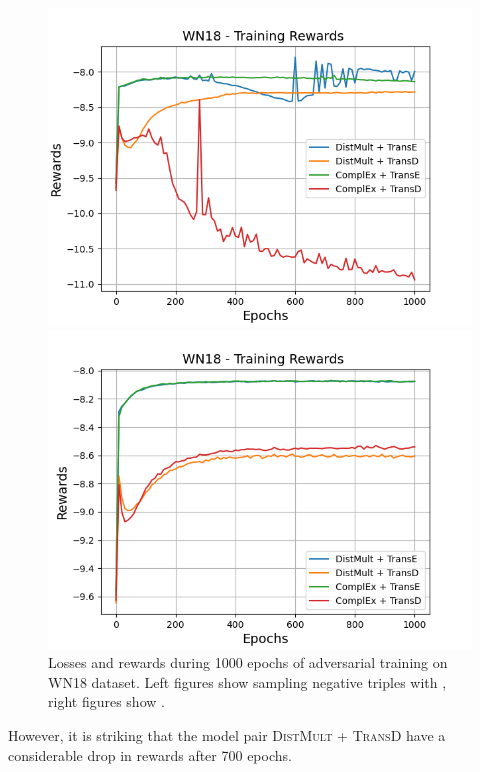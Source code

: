 \begin{figure}[H]
\begin{minipage}{.5\textwidth}
      \centering
      \includegraphics[width=0.9\linewidth]{figures/results/gan_train/not_pretrained/uncertainty/max/entropy/wn18/1k_epochs/uncertainty_wn18_rew.png}
    \end{minipage}%
    \begin{minipage}{.5\textwidth}
      \centering
      \includegraphics[width=0.9\linewidth]{figures/results/gan_train/not_pretrained/uncertainty/max_distribution/entropy/wn18/1k_epochs/uncertainty_wn18_rew.png}
    \end{minipage}%
    \caption{Losses and rewards during 1000 epochs of adversarial training on \textsc{WN18} dataset. 
    Left figures show sampling negative triples with \usmax, right figures show \ussoftmax.}
    \label{fig:advtrain_wn18_usmax_ussoftmax_losses_rewards}
\end{figure}
However, it is striking that the model pair \textsc{DistMult} + \textsc{TransD} have a considerable drop in rewards after 700 epochs.